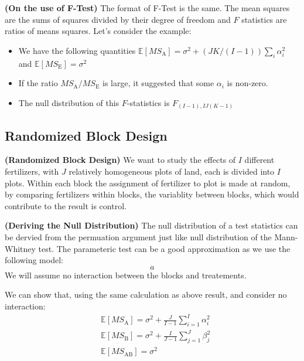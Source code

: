 \begin{remark}{\textbf{(On the use of F-Test)}}
    The format of F-Test is the same. The mean squares are the sums of squares divided by their degree of freedom and $F$ statistics are ratios of means squares. Let's consider the example:
    \begin{itemize}
        \item We have the following quantities $\mathbb{E}[MS_\text{A}] = \sigma^2 + (JK/(I-1))\sum_i\alpha_i^2$ and $\mathbb{E}[MS_\text{E}]= \sigma^2$
        \item If the ratio $MS_\text{A}/MS_\text{E}$ is large, it suggested that some $\alpha_i$ is non-zero. 
        \item The null distribution of this $F$-statistics is $F_{(I-1), IJ(K-1)}$
    \end{itemize}
\end{remark}

\subsection{Randomized Block Design}

\begin{definition}{\textbf{(Randomized Block Design)}}
    We want to study the effects of $I$ different fertilizers, with $J$ relatively homogeneous plots of land, each is divided into $I$ plots. Within each block the assignment of fertilizer to plot is made at random, by comparing fertilizers within blocks, the variablity between blocks, which would contribute  to the result is control. 
\end{definition}

\begin{remark}{\textbf{(Deriving the Null Distribution)}}
    The null distribution of a test statistics can be dervied from the permuation argument just like null distribution of the Mann-Whitney test. The parameteric test can be a good approximation as we use the following model:
    \begin{equation*}
        a
    \end{equation*}
    We will assume no interaction between the blocks and treatements. 
\end{remark}

\begin{proposition}
    We can show that, using the same calculation as above result, and consider no interaction:
    \begin{equation*}
    \begin{aligned}
        &\mathbb{E}[MS_\text{A}] = \sigma^2 + \frac{J}{I-1}\sum^I_{i=1}\alpha_i^2 \\
        &\mathbb{E}[MS_\text{B}] = \sigma^2 + \frac{I}{J-1}\sum^J_{j=1}\beta_j^2 \\
        &\mathbb{E}[MS_\text{AB}] = \sigma^2
    \end{aligned}
    \end{equation*}
\end{proposition}

